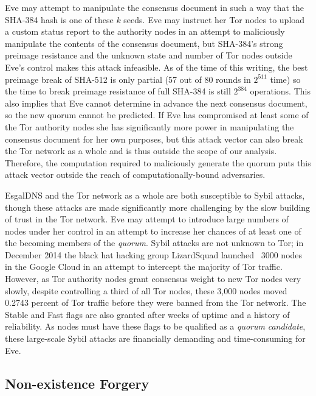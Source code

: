 Eve may attempt to manipulate the consensus document in such a way that the SHA-384 hash is one of these $ k $ seeds. Eve may instruct her Tor nodes to upload a custom status report to the authority nodes in an attempt to maliciously manipulate the contents of the consensus document, but SHA-384's strong preimage resistance and the unknown state and number of Tor nodes outside Eve's control makes this attack infeasible. As of the time of this writing, the best preimage break of SHA-512 is only partial (57 out of 80 rounds in $ 2^{511} $ time\cite{li2012converting}) so the time to break preimage resistance of full SHA-384 is still $ 2^{384} $ operations. This also implies that Eve cannot determine in advance the next consensus document, so the new quorum cannot be predicted. If Eve has compromised at least some of the Tor authority nodes she has significantly more power in manipulating the consensus document for her own purposes, but this attack vector can also break the Tor network as a whole and is thus outside the scope of our analysis. Therefore, the computation required to maliciously generate the quorum puts this attack vector outside the reach of computationally-bound adversaries.

EsgalDNS and the Tor network as a whole are both susceptible to Sybil attacks, though these attacks are made significantly more challenging by the slow building of trust in the Tor network. Eve may attempt to introduce large numbers of nodes under her control in an attempt to increase her chances of at least one of the becoming members of the \emph{quorum}. Sybil attacks are not unknown to Tor; in December 2014 the black hat hacking group LizardSquad launched ~3000 nodes in the Google Cloud in an attempt to intercept the majority of Tor traffic. However, as Tor authority nodes grant consensus weight to new Tor nodes very slowly, despite controlling a third of all Tor nodes, these 3,000 nodes moved 0.2743 percent of Tor traffic before they were banned from the Tor network. The Stable and Fast flags are also granted after weeks of uptime and a history of reliability. As nodes must have these flags to be qualified as a \emph{quorum} \emph{candidate}, these large-scale Sybil attacks are financially demanding and time-consuming for Eve.

\subsection{Non-existence Forgery}

